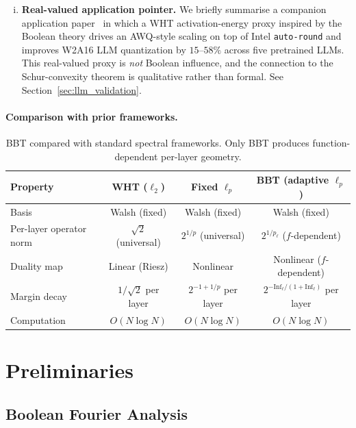 \documentclass[11pt]{article}
\newcommand{\Inf}{\mathrm{Inf}}
\begin{document}
\begin{enumerate}[(i)]
    \item \textbf{Real-valued application pointer.} We briefly summarise a companion application paper~\cite{bbtQuantCompanion} in which a WHT activation-energy proxy inspired by the Boolean theory drives an AWQ-style scaling on top of Intel \texttt{auto-round} and improves W2A16 LLM quantization by $15$--$58\%$ across five pretrained LLMs. This real-valued proxy is \emph{not} Boolean influence, and the connection to the Schur-convexity theorem is qualitative rather than formal. See Section~\ref{sec:llm_validation}.
\end{enumerate}

\paragraph{Comparison with prior frameworks.}

\begin{table}[t]
\centering
\small
\caption{BBT compared with standard spectral frameworks. Only BBT produces function-dependent per-layer geometry.}
\label{tab:comparison}
\begin{tabular}{lccc}
\toprule
\textbf{Property} & \textbf{WHT ($\ell_2$)} & \textbf{Fixed $\ell_p$} & \textbf{BBT (adaptive $\ell_p$)} \\
\midrule
Basis & Walsh (fixed) & Walsh (fixed) & Walsh (fixed) \\
Per-layer operator norm & $\sqrt{2}$ (universal) & $2^{1/p}$ (universal) & $2^{1/p_\ell}$ ($f$-dependent) \\
Duality map & Linear (Riesz) & Nonlinear & Nonlinear ($f$-dependent) \\
Margin decay & $1/\sqrt{2}$ per layer & $2^{-1+1/p}$ per layer & $2^{-\Inf_\ell/(1+\Inf_\ell)}$ per layer \\
Computation & $O(N \log N)$ & $O(N \log N)$ & $O(N \log N)$ \\
\bottomrule
\end{tabular}
\end{table}


\section{Preliminaries}
\label{sec:prelim}

\subsection{Boolean Fourier Analysis}
\end{document}
